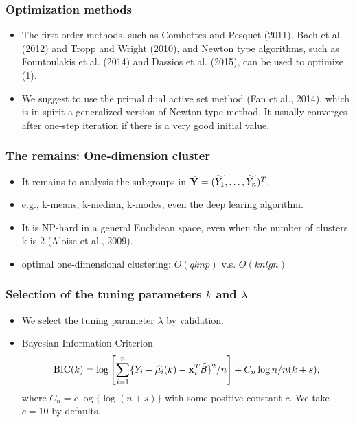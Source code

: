 \documentclass[hyperref={pdfpagelabels=false}]{beamer}
\begin{document}
\begin{frame}
	\frametitle{Optimization methods}
	\begin{itemize}
		\item The first order methods, such as Combettes and Pesquet (2011), Bach et al. (2012) and Tropp and Wright
		(2010), and Newton type algorithms, such as Fountoulakis et al. (2014) and Dassios et al. (2015), can be used
		to optimize (1).
		\item We suggest to use the primal dual active set method (Fan et al., 2014), which is in spirit a
		generalized version of Newton type method. It usually converges after one-step iteration if there is a very
		good initial value.
	\end{itemize}
\end{frame}

\begin{frame}
	\frametitle{The remains: One-dimension cluster}
	\begin{itemize}
		\item It remains to analysis the subgroups in $\widetilde{\mathbf{Y}} = (\widetilde{Y_1},\ldots,\widetilde{Y_n})^T$.
		\item e.g., k-means, k-median, k-modes, even the deep learing algorithm.
		\item It is NP-hard in a general Euclidean space, even when the number of clusters k is 2  (Aloise et al., 2009).
		\item optimal one-dimensional clustering: $O(qknp)$ v.s. $O(kn lg n)$ 
	\end{itemize}
\end{frame}

\begin{frame}
	\frametitle{Selection of the tuning parameters $k$ and $\lambda$}
	\begin{itemize}
		\item We select the tuning parameter $\lambda$ by validation.
		\item Bayesian Information Criterion
		$$
		\mathrm{BIC}(k) = \log \left[\sum_{i = 1}^n\{Y_i - \widehat{\mu_i}(k) - {\bf x}_i^T\widehat{\bm{\beta}}\}^2/n\right] + C_n \log n/n(k + s),
		$$
		where $C_n = c\log\{\log(n+s)\}$ with some positive constant $c$. We take $c = 10$ by defaults.
	\end{itemize}
\end{frame}
\end{document}
